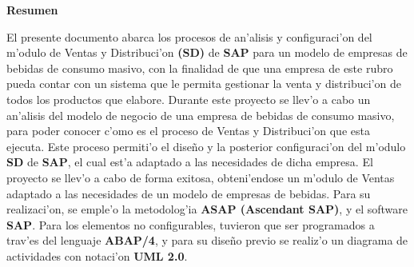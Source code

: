 \setcounter{page}{4}
\begin{center}
	{\bf Resumen}
\end{center}	

\indent El presente documento abarca los procesos de an'alisis y configuraci'on del m'odulo de Ventas y Distribuci'on \textbf{(SD)} de \textbf{SAP} para un modelo de empresas de bebidas de consumo masivo, con la finalidad de que una empresa de este rubro pueda contar con un sistema que le permita gestionar la venta y distribuci'on de todos los productos que elabore.
\newline
\newline
\indent Durante este proyecto se llev'o a cabo un an'alisis del modelo de negocio de una empresa de bebidas de consumo masivo, para poder conocer c'omo es el proceso de Ventas y Distribuci'on que esta ejecuta. Este proceso permiti'o el dise\~no y la posterior configuraci'on del m'odulo \textbf{SD} de \textbf{SAP}, el cual est'a adaptado a las necesidades de dicha empresa.
\newline
\newline
\indent El proyecto se llev'o a cabo de forma exitosa, obteni'endose un m'odulo de Ventas adaptado a las necesidades de un modelo de empresas de bebidas. Para su realizaci'on, se emple'o la metodolog'ia \textbf{ASAP (Ascendant SAP)}, y el software \textbf{SAP}. Para los elementos no configurables, tuvieron que ser programados a trav'es del lenguaje \textbf{ABAP/4}, y para su dise\~no previo se realiz'o un diagrama de actividades con notaci'on \textbf{UML 2.0}.

\newpage
